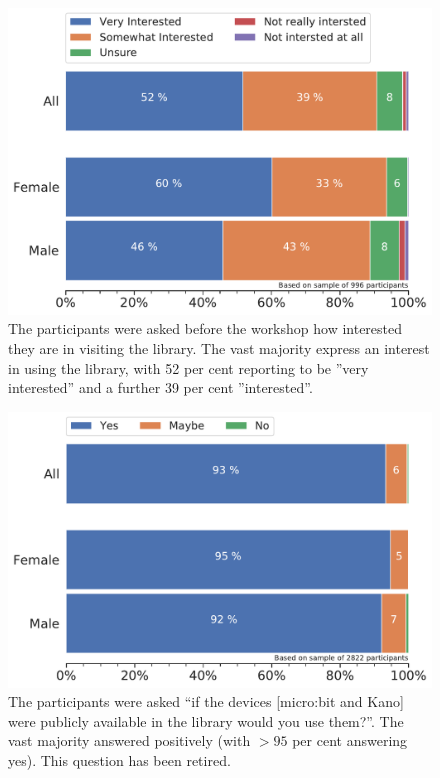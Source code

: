 \documentclass[12pt]{report} %
\begin{document}
\begin{figure}[t!]
    \centering
        \includegraphics[width=1\textwidth]{bar_DesireLibraryVisit}
\caption{The participants were asked before the workshop how interested they are in visiting the library. The vast majority express an interest in using the library, with 52 per cent reporting to be ''very interested'' and a further 39 per cent ''interested''. }
\label{fig:libvisitinterest}
\end{figure}


\begin{figure}[t!]
    \centering
        \includegraphics[width=1\textwidth]{bar_usedevices}
\caption{The participants were asked ``if the devices [micro:bit and Kano] were publicly available in the library would you use them?''. The vast majority answered positively (with $>95$ per cent answering yes). This question has been retired. } 
\label{fig:usedevices}
\end{figure}
\end{document}
